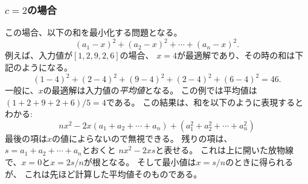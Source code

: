\begin{comment}
\subsubsection{Case $c=2$}

In this case, we should minimize the sum
\[(a_1-x)^2+(a_2-x)^2+\cdots+(a_n-x)^2.\]
For example, if the numbers are $[1,2,9,2,6]$,
the best solution is to select $x=4$
which produces the sum
\[
(1-4)^2+(2-4)^2+(9-4)^2+(2-4)^2+(6-4)^2=46.
\]
In the general case, the best choice for $x$
is the \emph{average} of the numbers.
In the example the average is $(1+2+9+2+6)/5=4$.
This result can be derived by presenting
the sum as follows:
\[
nx^2 - 2x(a_1+a_2+\cdots+a_n) + (a_1^2+a_2^2+\cdots+a_n^2)
\]
The last part does not depend on $x$,
so we can ignore it.
The remaining parts form a function
$nx^2-2xs$ where $s=a_1+a_2+\cdots+a_n$.
This is a parabola opening upwards
with roots $x=0$ and $x=2s/n$,
and the minimum value is the average
of the roots $x=s/n$, i.e.,
the average of the numbers $a_1,a_2,\ldots,a_n$.
\end{comment}

\subsubsection{$c=2$の場合}

この場合、以下の和を最小化する問題となる。
\[(a_1-x)^2+(a_2-x)^2+\cdots+(a_n-x)^2.\]
例えば、入力値が$[1,2,9,2,6]$の場合、
$x=4$が最適解であり、その時の和は下記のようになる。
\[
(1-4)^2+(2-4)^2+(9-4)^2+(2-4)^2+(6-4)^2=46.
\]
一般に、$x$の最適解は入力値の\emph{平均値}となる。
この例では平均値は$(1+2+9+2+6)/5=4$である。
この結果は、和を以下のように表現するとわかる:
\[
nx^2 - 2x(a_1+a_2+\cdots+a_n) + (a_1^2+a_2^2+\cdots+a_n^2)
\]
最後の項は$x$の値によらないので無視できる。
残りの項は、$s=a_1+a_2+\cdots+a_n$とおくと
$nx^2-2xs$と表せる。
これは上に開いた放物線で、$x=0$と$x=2s/n$が根となる。
そして最小値は$x=s/n$のときに得られるが、
これは先ほど計算した平均値そのものである。

